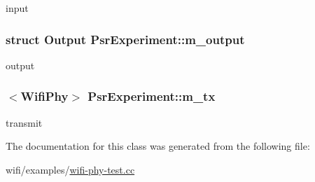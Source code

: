input 

\subsubsection[{\texorpdfstring{m\+\_\+output}{m_output}}]{\setlength{\rightskip}{0pt plus 5cm}struct {\bf Output} Psr\+Experiment\+::m\+\_\+output\hspace{0.3cm}{\ttfamily [private]}}\hypertarget{classPsrExperiment_ae7fa4520d7fbf118bbf399386b4295c4}{}\label{classPsrExperiment_ae7fa4520d7fbf118bbf399386b4295c4}


output 

\subsubsection[{\texorpdfstring{m\+\_\+tx}{m_tx}}]{$<${\bf Wifi\+Phy}$>$ Psr\+Experiment\+::m\+\_\+tx\hspace{0.3cm}{\ttfamily [private]}}\hypertarget{classPsrExperiment_a25ce1f8accba8869a380f77e93090dca}{}\label{classPsrExperiment_a25ce1f8accba8869a380f77e93090dca}


transmit 



The documentation for this class was generated from the following file\+:\begin{DoxyCompactItemize}
\item 
wifi/examples/\hyperlink{wifi-phy-test_8cc}{wifi-\/phy-\/test.\+cc}\end{DoxyCompactItemize}
